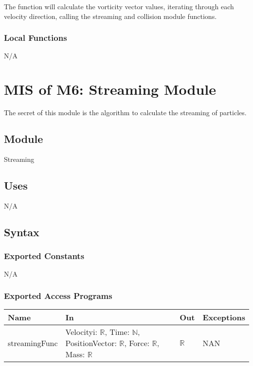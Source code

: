 \documentclass[12pt, titlepage]{article}
\begin{document}
The function will calculate the vorticity vector values, iterating through each velocity direction, calling the streaming and collision module functions.

\subsubsection{Local Functions}

N/A

\newpage

\section{MIS of M6: Streaming Module} \label{STModule}

The secret of this module is the algorithm to calculate the streaming of particles.

\subsection{Module}

Streaming

\subsection{Uses}
N/A
\subsection{Syntax}

\subsubsection{Exported Constants}
N/A

\subsubsection{Exported Access Programs}

\begin{center}
	\begin{tabular}{p{3cm} p{3cm} p{3cm} p{2cm}}
		\hline
		\textbf{Name} & \textbf{In} & \textbf{Out} & \textbf{Exceptions} \\
		\hline
		streamingFunc & Velocityi: $\mathbb{R}$, Time: $\mathbb{N}$, PositionVector: $\mathbb{R}$, Force: $\mathbb{R}$, Mass: $\mathbb{R}$ & $\mathbb{R}$ & NAN \\
		\hline
	\end{tabular}
\end{center}
\end{document}

